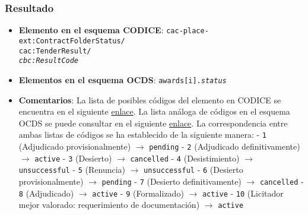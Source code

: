         \subsubsection{Resultado}
            \begin{itemize}
                \item \textbf{Elemento en el esquema CODICE}:
                    \tabto{7.6cm} \texttt{cac-place-ext:ContractFolderStatus/} \\
                    \tabto{7.6cm} \texttt{cac:TenderResult/} \\
                    \tabto{7.6cm} \texttt{\textit{cbc:ResultCode}}
                \item \textbf{Elementos en el esquema OCDS}:
                    \tabto{7.6cm} \texttt{awards[i].\textit{status}}
                \item \textbf{Comentarios}: La lista de posibles códigos del elemento en CODICE se encuentra en el siguiente 
                    \href{http://contrataciondelestado.es/codice/cl/2.02/TenderResultCode-2.02.gc}{enlace}.
                    La lista análoga de códigos en el esquema OCDS se puede consultar en el siguiente
                    \href{https://standard.open-contracting.org/latest/en/schema/codelists/#award-status}{enlace}.
                    La correspondencia entre ambas listas de códigos se ha establecido de la siguiente manera:
                        \subitem - \texttt{1} (Adjudicado provisionalmente) $\rightarrow$ \texttt{pending}
                        \subitem - \texttt{2} (Adjudicado definitivamente) $\rightarrow$ \texttt{active}
                        \subitem - \texttt{3} (Desierto) $\rightarrow$ \texttt{cancelled}
                        \subitem - \texttt{4} (Desistimiento) $\rightarrow$ \texttt{unsuccessful}
                        \subitem - \texttt{5} (Renuncia) $\rightarrow$ \texttt{unsuccessful}
                        \subitem - \texttt{6} (Desierto provisionalmente) $\rightarrow$ \texttt{pending}
                        \subitem - \texttt{7} (Desierto definitivamente) $\rightarrow$ \texttt{cancelled}
                        \subitem - \texttt{8} (Adjudicado) $\rightarrow$ \texttt{active}
                        \subitem - \texttt{9} (Formalizado) $\rightarrow$ \texttt{active}
                        \subitem - \texttt{10} (Licitador mejor valorado: requerimiento de documentación) $\rightarrow$ \texttt{active}
            \end{itemize}
            
